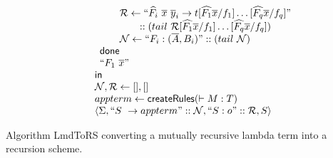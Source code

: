 \begin{table}[htbp]
$$\begin{array}{ll}
\begin{array}{lcl}
     &&\qquad \mathcal{R} \leftarrow \mbox{``}\widehat{F_i}\ \overline{x} \ \overline{y}_i \rightarrow t[\widehat{F_1} \overline{x}/f_1] \ldots [\widehat{F_q} \overline{x}/ f_q]\mbox{''} \\
     &&\qquad\qquad ::(tail\ \mathcal{R}[\widehat{F_1} \overline{x}/f_1] \ldots [\widehat{F_q} \overline{x}/ f_q]) \\
     &&\qquad\mathcal{N} \leftarrow \mbox{``}F_i : (\overline{A},B_i)\mbox{''}::(tail\ \mathcal{N}) \\
     &&{\sf done} \\
     &&\mbox{``}F_1\ \overline{x}\mbox{''}
   \end{array} \\
\qquad {\sf in}\\
\qquad \mathcal{N},\mathcal{R} \leftarrow [],[]  \\
\qquad appterm \leftarrow {\sf createRules}(\vdash M : T) \\
\qquad \langle \Sigma, \mbox{``}S\ \rightarrow appterm\mbox{''}::\mathcal{N}, \mbox{``}S:o\mbox{''}::\mathcal{R}, S \rangle
\end{array}$$

\caption{Algorithm {\sf LmdToRS} converting a mutually recursive lambda term into a recursion scheme.}
\label{tab:LmdToRS}
\end{table}


